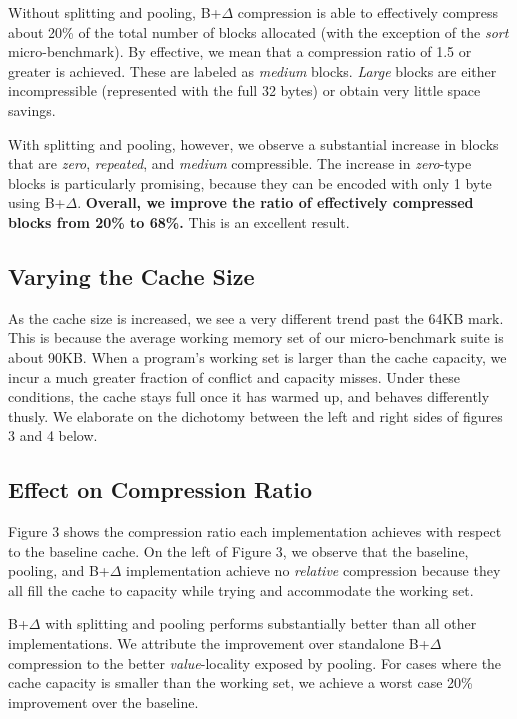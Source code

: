 \documentclass[pageno]{jpaper}
\begin{document}
Without splitting and pooling, B+$\Delta$ compression is able to effectively compress about 20\% of the total number of blocks allocated (with the exception of the \textit{sort} micro-benchmark). By effective, we mean that a compression ratio of 1.5 or greater is achieved. These are labeled as \textit{medium} blocks. \textit{Large} blocks are either incompressible (represented with the full 32 bytes) or obtain very little space savings.

With splitting and pooling, however, we observe a substantial increase in blocks that are \textit{zero}, \textit{repeated}, and \textit{medium} compressible. The increase in \textit{zero}-type blocks is particularly promising, because they can be encoded with only 1 byte using B+$\Delta$. \textbf{Overall, we improve the ratio of effectively compressed blocks from 20\% to 68\%.} This is an excellent result. 


\subsection{Varying the Cache Size}
As the cache size is increased, we see a very different trend past the 64KB mark. This is because the average working memory set of our micro-benchmark suite is about 90KB. When a program's working set is larger than the cache capacity, we incur a much greater fraction of conflict and capacity misses. Under these conditions, the cache stays full once it has warmed up, and behaves differently thusly. We elaborate on the dichotomy between the left and right sides of figures 3 and 4 below.


\subsection{Effect on Compression Ratio}
Figure 3 shows the compression ratio each implementation achieves with respect to the baseline cache. On the left of Figure 3, we observe that the baseline, pooling, and B+$\Delta$ implementation achieve no \textit{relative} compression because they all fill the cache to capacity while trying and accommodate the working set. 

B+$\Delta$ with splitting and pooling performs substantially better than all other implementations. We attribute the improvement over standalone B+$\Delta$ compression to the better \textit{value}-locality exposed by pooling. For cases where the cache capacity is smaller than the working set, we achieve a worst case 20\% improvement over the baseline.
\end{document}
